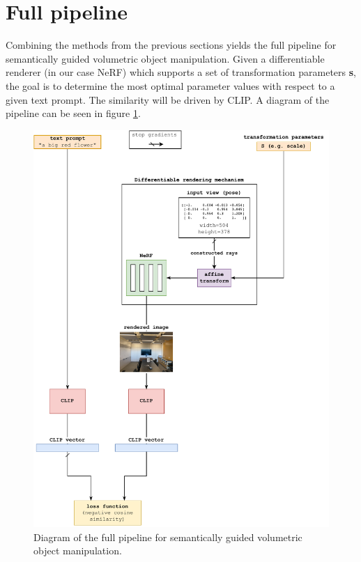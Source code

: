 \section{Full pipeline}
Combining the methods from the previous sections yields the full pipeline for semantically guided volumetric object manipulation. Given a differentiable renderer (in our case NeRF) which supports a set of transformation parameters \textbf{s}, the goal is to determine the most optimal parameter values with respect to a given text prompt. The similarity will be driven by CLIP. A diagram of the pipeline can be seen in figure \ref{fig:full-pipeline}.
\begin{figure}[H]
    \centering
    \includegraphics[width=1.0\textwidth]{figures/full-pipeline.pdf}
    \caption{Diagram of the full pipeline for semantically guided volumetric object manipulation.}
    \label{fig:full-pipeline}
\end{figure}
